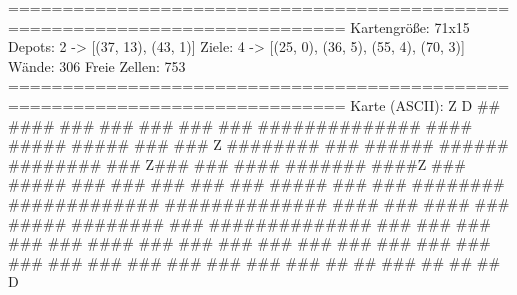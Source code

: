 =============================================================================
Kartengröße:           71x15
Depots:                2 -> [(37, 13), (43, 1)]
Ziele:                 4 -> [(25, 0), (36, 5), (55, 4), (70, 3)]
Wände:                 306
Freie Zellen:          753
=============================================================================
Karte (ASCII):
                         Z
                                           D
   ##       ####     ###       ###     ###         ###  ###
  ##############     ####     #####    #####       ###  ###           Z
  ########   ###    ######   ######    ########    ### Z###
  ###              #### ####### ####Z  ###  #####  ###  ###      ###
  ###              ###   #####   ###   ###    ########  #############
  ##############  ####    ###    ####  ###       #####  ########  ###
  ##############          ###          ###         ###  ###       ###
  ####       ###          ###          ###              ###       ###
  ###        ###          ###          ###              ###       ###
  ###        ###          ###          ###              ###       ###
   ##         ##          ###           ##              ##         ##
                                     D

